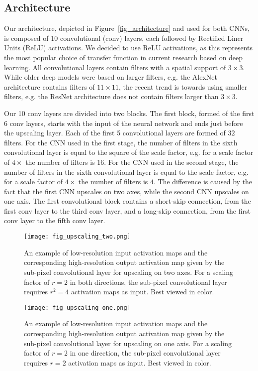 \documentclass{ieeeaccess}
\begin{document}
\subsection{Architecture}

Our architecture, depicted in Figure~\ref{fig_architecture} and used for both CNNs, is composed of 10 convolutional (conv) layers, each followed by Rectified Liner Units (ReLU) \cite{Nair-ICML-2010} activations. We decided to use ReLU activations, as this represents the most popular choice of transfer function in current research based on deep learning. All convolutional layers contain filters with a spatial support of $3\times3$. While older deep models were based on larger filters, e.g. the AlexNet \cite{Hinton-NIPS-2012} architecture contains filters of $11\times11$, the recent trend is towards using smaller filters, e.g. the ResNet \cite{He-CVPR-2016} architecture does not contain filters larger than $3\times3$.

Our 10 conv layers are divided into two blocks. The first block, formed of the first 6 conv layers, starts with the input of the neural network and ends just before the upscaling layer. Each of the first 5 convolutional layers are formed of $32$ filters. For the CNN used in the first stage, the number of filters in the sixth convolutional layer is equal to the square of the scale factor, e.g. for a scale factor of $4\times$ the number of filters is $16$. For the CNN used in the second stage, the number of filters in the sixth convolutional layer is equal to the scale factor, e.g. for a scale factor of $4\times$ the number of filters is $4$. The difference is caused by the fact that the first CNN upscales on two axes, while the second CNN upscales on one axis. The first convolutional block contains a short-skip connection, from the first conv layer to the third conv layer, and a long-skip connection, from the first conv layer to the fifth conv layer.

\begin{figure}[t!]
\centering
\texttt{[image: fig\_upscaling\_two.png]}
\caption{An example of low-resolution input activation maps and the corresponding high-resolution output activation map given by the sub-pixel convolutional layer for upscaling on two axes. For a scaling factor of $r=2$ in both directions, the sub-pixel convolutional layer requires $r^2=4$ activation maps as input. Best viewed in color.}
\label{fig_upscaling_two}
\end{figure}

\begin{figure}[t!]
\centering
\texttt{[image: fig\_upscaling\_one.png]}
\caption{An example of low-resolution input activation maps and the corresponding high-resolution output activation map given by the sub-pixel convolutional layer for upscaling on one axis. For a scaling factor of $r=2$ in one direction, the sub-pixel convolutional layer requires $r=2$ activation maps as input. Best viewed in color.}
\label{fig_upscaling_one}
\end{figure}
\end{document}
